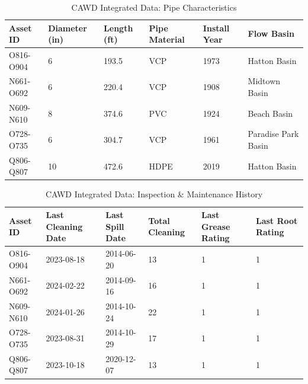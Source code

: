 \documentclass[10pt]{article}
\begin{document}
\begin{table}[h]
\centering
\caption{CAWD Integrated Data: Pipe Characteristics}
\label{tab:pipe-char}
\begin{tabular}{p{2cm} p{1.5cm} p{1.5cm} p{2cm} p{1cm} p{3.5cm}}
\toprule
\textbf{Asset ID} & \textbf{Diameter (in)} & \textbf{Length (ft)} & \textbf{Pipe Material} & \textbf{Install Year} & \textbf{Flow Basin}\\
\midrule
O816-O904 & 6  & 193.5 & VCP  & 1973 & Hatton Basin \\
N661-O692 & 6  & 220.4 & VCP  & 1908 & Midtown Basin \\
N609-N610 & 8  & 374.6 & PVC  & 1924 & Beach Basin \\
O728-O735 & 6  & 304.7 & VCP  & 1961 & Paradise Park Basin \\
Q806-Q807 & 10 & 472.6 & HDPE & 2019 & Hatton Basin \\
\bottomrule
\end{tabular}
\end{table}

\begin{table}[h]
\centering
\caption{CAWD Integrated Data: Inspection \& Maintenance History}
\label{tab:pipe-maint}
\begin{tabular}{p{2cm} p{2cm} p{2cm} p{2.5cm} p{1.8cm} p{2cm}}
\toprule
\textbf{Asset ID} & \textbf{Last Cleaning Date} & \textbf{Last Spill Date} & \textbf{Total Cleaning} & \textbf{Last Grease Rating} & \textbf{Last Root Rating}\\
\midrule
O816-O904 & 2023-08-18 & 2014-06-20 & 13 & 1 & 1 \\
N661-O692 & 2024-02-22 & 2014-09-16 & 16 & 1 & 1 \\
N609-N610 & 2024-01-26 & 2014-10-24 & 22 & 1 & 1 \\
O728-O735 & 2023-08-31 & 2014-10-29 & 17 & 1 & 1 \\
Q806-Q807 & 2023-10-18 & 2020-12-07 & 13 & 1 & 1 \\
\bottomrule
\end{tabular}
\end{table}


\newpage


\end{document}
